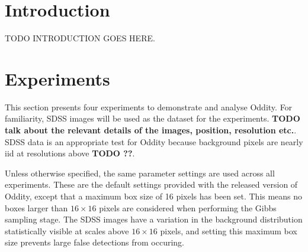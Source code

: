 \documentclass[manuscript]{aastex}
\newcommand{\TODO}[1]{\textbf{TODO #1}}
\begin{document}




\section{Introduction}

TODO INTRODUCTION GOES HERE.

\section{Experiments}

This section presents four experiments to demonstrate and analyse Oddity. For familiarity, SDSS images will be used as the dataset for the experiments. \TODO{talk about the relevant details of the images, position, resolution etc.}. SDSS data is an appropriate test for Oddity because background pixels are nearly iid at resolutions above \TODO{??}.

Unless otherwise specified, the same parameter settings are used across all experiments. These are the default settings provided with the released version of Oddity, except that a maximum box size of 16 pixels has been set. This means no boxes larger than $16\times16$ pixels are considered when performing the Gibbs sampling stage. The SDSS images have a variation in the background distribution statistically visible at scales above $16 \times 16$ pixels, and setting this maximum box size prevents large false detections from occuring.
\end{document}
